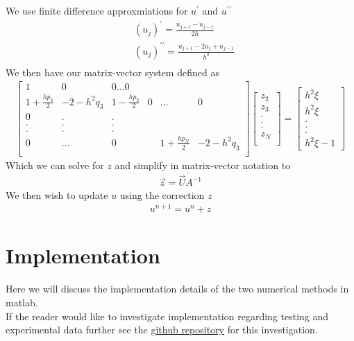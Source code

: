 \documentclass{article}
\begin{document}
\begin{enumerate}
We use finite difference approxmiations for $u^\prime$ and $u^{\prime\prime}$
\begin{align}
&(u_j)^\prime = \frac{u_{j+1} - u_{j-1}}{2h} \\
&(u_j)^{\prime\prime} = \frac{u_{j+1} - 2u_{j} + u_{j-1}}{h^2} \\
\end{align}
We then have our matrix-vector system defined as
\begin{align}
\begin{bmatrix}
1 & 0 & 0 ... 0 \\
1 + \frac{hp_3}{2} & -2 - h^2q_3 & 1 - \frac{hp_3}{2} & 0 &...& 0\\
0 & . & . \\
. & . & . \\
. & . & . \\
0 & ... &0 & & 1 + \frac{hp_N}{2} & -2 - h^2q_3 \\
\end{bmatrix}
\begin{bmatrix}
z_2 \\ z_3 \\ . \\ . \\ . \\ z_N\\
\end{bmatrix}
=
\begin{bmatrix}
h^2 \xi \\
h^2 \xi \\
. \\
. \\
. \\
h^2 \xi - 1
\end{bmatrix}
\end{align}
Which we can solve for $z$ and simplify in matrix-vector notation to
\begin{align}
\vec{z} = \vec{U} A^{-1} 
\end{align}
We then wish to update $u$ using the correction $z$
\begin{align}
u^{n + 1} = u^{n} + z
\end{align}
\end{enumerate}
\section{Implementation}
Here we will discuss the implementation details of the two numerical methods in matlab. \\
If the reader would like to investigate implementation regarding testing and experimental data further see the \href{https://github.com/Liam-Watson/3AN-Vortex-Solutions}{ github repository} for this investigation.
\end{document}
